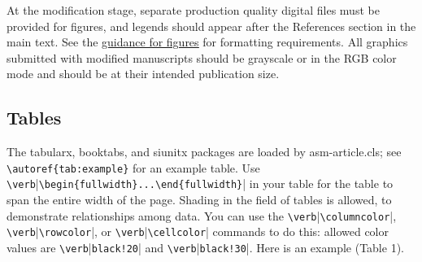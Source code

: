 \documentclass{asmarticle}
\begin{document}
	At the modification stage, separate production quality digital files must be provided for figures, and legends should appear after the References section in the main text. See the \href{https://journals.asm.org/figures-tables}{\underline{guidance for figures}} for formatting requirements. All graphics submitted with modified manuscripts should be grayscale or in the RGB color mode and should be at their intended publication size. 

\subsection{Tables}
	The tabularx, booktabs, and siunitx packages are loaded by asm-article.cls; see \verb|\autoref{tab:example}| for an example table. Use \verb|\verb||\verb|\begin{fullwidth}...\end{fullwidth}|| in your table for the table to span the entire width of the page. Shading in the field of tables is allowed, to demonstrate relationships among data. You can use the \verb|\verb||\verb|\columncolor||, \verb|\verb||\verb|\rowcolor||, or \verb|\verb||\verb|\cellcolor|| commands to do this: allowed color values are \verb|\verb||\verb|black!20|| and \verb|\verb||\verb|black!30||. Here is an example (Table 1).
\end{document}
